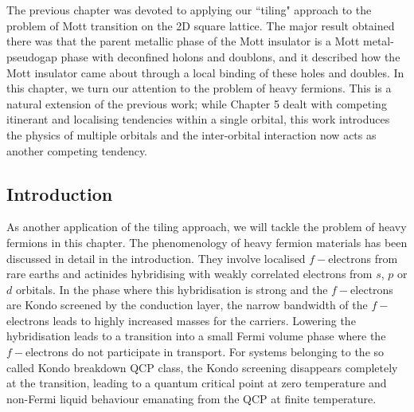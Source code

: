 \chapter{\chapF}\label{sec:tileHF}

The previous chapter was devoted to applying our ``tiling" approach to the problem of Mott transition on the 2D square lattice. The major result obtained there was that the parent metallic phase of the Mott insulator is a Mott metal-pseudogap phase with deconfined holons and doublons, and it described how the Mott insulator came about through a local binding of these holes and doubles. In this chapter, we turn our attention to the problem of heavy fermions. This is a natural extension of the previous work; while Chapter 5 dealt with competing itinerant and localising tendencies within a single orbital, this work introduces the physics of multiple orbitals and the inter-orbital interaction now acts as another competing tendency.

\section{Introduction}
As another application of the tiling approach, we will tackle the problem of heavy fermions in this chapter. The phenomenology of heavy fermion materials has been discussed in detail in the introduction. They involve localised \(f-\)electrons from rare earths and actinides hybridising with weakly correlated electrons from \(s\), \(p\) or \(d\) orbitals. In the phase where this hybridisation is strong and the \(f-\)electrons are Kondo screened by the conduction layer, the narrow bandwidth of the \(f-\)electrons leads to highly increased masses for the carriers. Lowering the hybridisation leads to a transition into a small Fermi volume phase where the \(f-\)electrons do not participate in transport. For systems belonging to the so called Kondo breakdown QCP class, the Kondo screening disappears completely at the transition, leading to a quantum critical point at zero temperature and non-Fermi liquid behaviour emanating from the QCP at finite temperature. 

